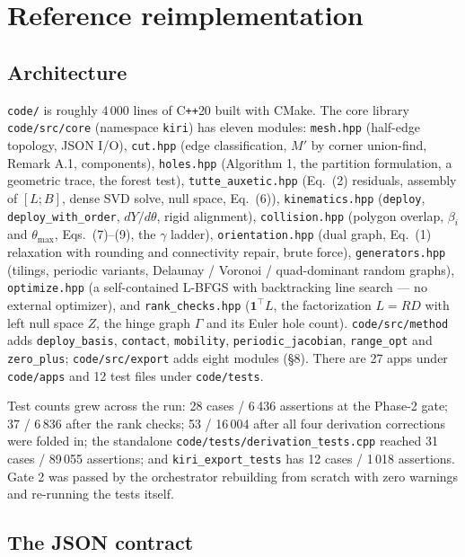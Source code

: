 \documentclass[10pt,a4paper]{article}
\newcommand{\fn}[1]{\nolinkurl{#1}}
\begin{document}
\section{Reference reimplementation}

\subsection{Architecture}

\fn{code/} is roughly 4\,000 lines of C\texttt{++}20 built with CMake. The core library
\fn{code/src/core} (namespace \texttt{kiri}) has eleven modules:
\fn{mesh.hpp} (half-edge topology, JSON I/O),
\fn{cut.hpp} (edge classification, $M'$ by corner union-find, Remark A.1, components),
\fn{holes.hpp} (Algorithm 1, the partition formulation, a geometric trace, the forest test),
\fn{tutte_auxetic.hpp} (Eq.~(2) residuals, assembly of $[L;B]$, dense SVD solve, null space,
Eq.~(6)),
\fn{kinematics.hpp} (\texttt{deploy}, \texttt{deploy\_with\_order}, $dY/d\theta$, rigid
alignment),
\fn{collision.hpp} (polygon overlap, $\beta_i$ and $\theta_{\max}$, Eqs.~(7)--(9), the $\gamma$
ladder),
\fn{orientation.hpp} (dual graph, Eq.~(1) relaxation with rounding and connectivity repair,
brute force),
\fn{generators.hpp} (tilings, periodic variants, Delaunay / Voronoi / quad-dominant random
graphs),
\fn{optimize.hpp} (a self-contained L-BFGS with backtracking line search --- no external
optimizer),
and \fn{rank_checks.hpp} ($\mathbf 1^{\!\top}L$, the factorization $L=RD$ with left null space
$Z$, the hinge graph $\Gamma$ and its Euler hole count).
\fn{code/src/method} adds \fn{deploy_basis}, \fn{contact}, \fn{mobility},
\fn{periodic_jacobian}, \fn{range_opt} and \fn{zero_plus}; \fn{code/src/export} adds eight
modules (\S8). There are 27 apps under \fn{code/apps} and 12 test files under \fn{code/tests}.

Test counts grew across the run: 28 cases / 6\,436 assertions at the Phase-2 gate;
37 / 6\,836 after the rank checks; 53 / 16\,004 after all four derivation corrections were
folded in; the standalone \fn{code/tests/derivation_tests.cpp} reached 31 cases / 89\,055
assertions; and \fn{kiri_export_tests} has 12 cases / 1\,018 assertions.
Gate 2 was passed by the orchestrator rebuilding from scratch with zero warnings and re-running
the tests itself.

\subsection{The JSON contract}
\end{document}
